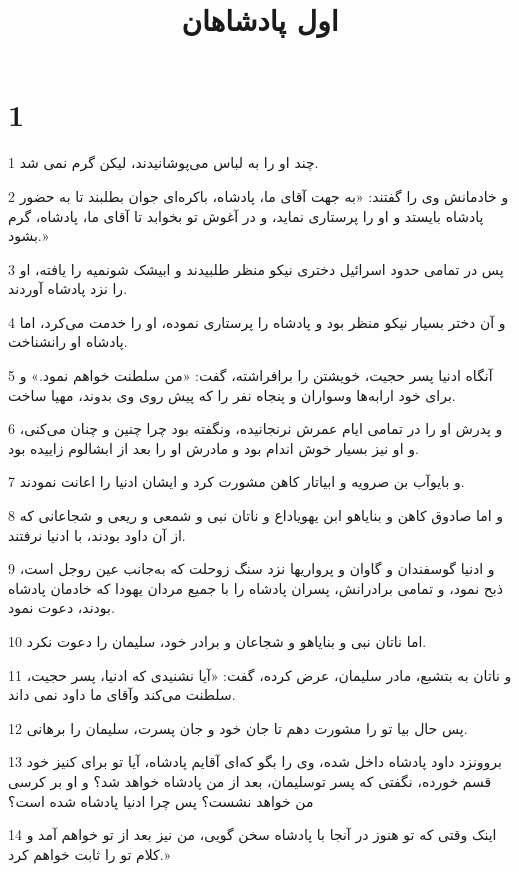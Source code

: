 

\title{اول پادشاهان}

 
\chapter{1}

\par 1 چند او را به لباس می‌پوشانیدند، لیکن گرم نمی شد.
\par 2 و خادمانش وی را گفتند: «به جهت آقای ما، پادشاه، باکره‌ای جوان بطلبند تا به حضور پادشاه بایستد و او را پرستاری نماید، و در آغوش تو بخوابد تا آقای ما، پادشاه، گرم بشود.»
\par 3 پس در تمامی حدود اسرائیل دختری نیکو منظر طلبیدند و ابیشک شونمیه را یافته، او را نزد پادشاه آوردند.
\par 4 و آن دختر بسیار نیکو منظر بود و پادشاه را پرستاری نموده، او را خدمت می‌کرد، اما پادشاه او رانشناخت.
\par 5 آنگاه ادنیا پسر حجیت، خویشتن را برافراشته، گفت: «من سلطنت خواهم نمود.» و برای خود ارابه‌ها وسواران و پنجاه نفر را که پیش روی وی بدوند، مهیا ساخت.
\par 6 و پدرش او را در تمامی ایام عمرش نرنجانیده، ونگفته بود چرا چنین و چنان می‌کنی، و او نیز بسیار خوش اندام بود و مادرش او را بعد از ابشالوم زاییده بود.
\par 7 و بایوآب بن صرویه و ابیاتار کاهن مشورت کرد و ایشان ادنیا را اعانت نمودند.
\par 8 و اما صادوق کاهن و بنایاهو ابن یهویاداع و ناتان نبی و شمعی و ریعی و شجاعانی که از آن داود بودند، با ادنیا نرفتند.
\par 9 و ادنیا گوسفندان و گاوان و پرواریها نزد سنگ زوحلت که به‌جانب عین روجل است، ذبح نمود، و تمامی برادرانش، پسران پادشاه را با جمیع مردان یهودا که خادمان پادشاه بودند، دعوت نمود.
\par 10 اما ناتان نبی و بنایاهو و شجاعان و برادر خود، سلیمان را دعوت نکرد.
\par 11 و ناتان به بتشبع، مادر سلیمان، عرض کرده، گفت: «آیا نشنیدی که ادنیا، پسر حجیت، سلطنت می‌کند وآقای ما داود نمی داند.
\par 12 پس حال بیا تو را مشورت دهم تا جان خود و جان پسرت، سلیمان را برهانی.
\par 13 بروونزد داود پادشاه داخل شده، وی را بگو که‌ای آقایم پادشاه، آیا تو برای کنیز خود قسم خورده، نگفتی که پسر توسلیمان، بعد از من پادشاه خواهد شد؟ و او بر کرسی من خواهد نشست؟ پس چرا ادنیا پادشاه شده است؟
\par 14 اینک وقتی که تو هنوز در آنجا با پادشاه سخن گویی، من نیز بعد از تو خواهم آمد و کلام تو را ثابت خواهم کرد.»
